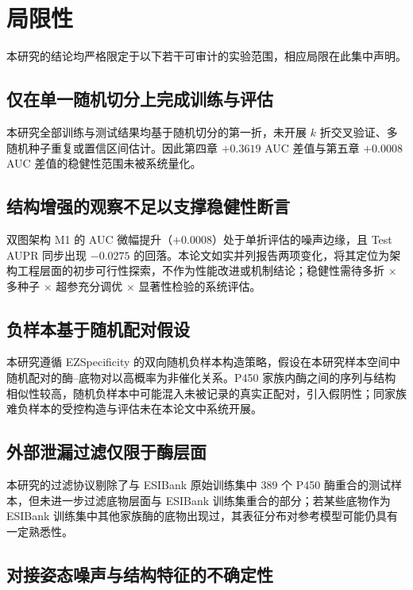 \section{局限性}
\label{sec:limitations-final}

本研究的结论均严格限定于以下若干可审计的实验范围，相应局限在此集中声明。

\subsection{仅在单一随机切分上完成训练与评估}
\label{subsec:limit-fold}

本研究全部训练与测试结果均基于随机切分的第一折，未开展 $k$ 折交叉验证、多随机种子重复或置信区间估计。因此第四章 $+0.3619$ AUC 差值与第五章 $+0.0008$ AUC 差值的稳健性范围未被系统量化。

\subsection{结构增强的观察不足以支撑稳健性断言}
\label{subsec:limit-structure}

双图架构 M1 的 AUC 微幅提升（$+0.0008$）处于单折评估的噪声边缘，且 Test AUPR 同步出现 $-0.0275$ 的回落。本论文如实并列报告两项变化，将其定位为架构工程层面的初步可行性探索，不作为性能改进或机制结论；稳健性需待多折 $\times$ 多种子 $\times$ 超参充分调优 $\times$ 显著性检验的系统评估。

\subsection{负样本基于随机配对假设}
\label{subsec:limit-neg}

本研究遵循 EZSpecificity 的双向随机负样本构造策略，假设在本研究样本空间中随机配对的酶--底物对以高概率为非催化关系。P450 家族内酶之间的序列与结构相似性较高，随机负样本中可能混入未被记录的真实正配对，引入假阴性；同家族难负样本的受控构造与评估未在本论文中系统开展。

\subsection{外部泄漏过滤仅限于酶层面}
\label{subsec:limit-leak}

本研究的过滤协议剔除了与 ESIBank 原始训练集中 $389$ 个 P450 酶重合的测试样本，但未进一步过滤底物层面与 ESIBank 训练集重合的部分；若某些底物作为 ESIBank 训练集中其他家族酶的底物出现过，其表征分布对参考模型可能仍具有一定熟悉性。

\subsection{对接姿态噪声与结构特征的不确定性}
\label{subsec:limit-dock}

